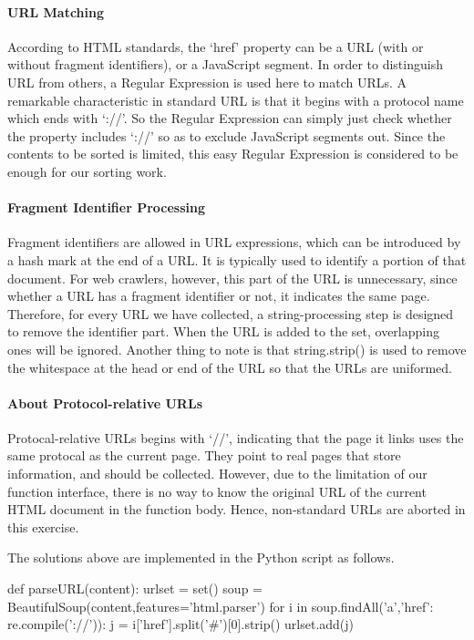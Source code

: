 \documentclass{article}
\begin{document}
\paragraph{URL Matching} According to HTML standards, the `href' property can be a URL (with or without fragment identifiers), or a JavaScript segment. In order to distinguish URL from others, a Regular Expression is used here to match URLs. A remarkable characteristic in standard URL is that it begins with a protocol name which ends with `://'. So the Regular Expression can simply just check whether the property includes `://'   so as to exclude JavaScript segments out. Since the contents to be sorted is limited, this easy Regular Expression is considered to be enough for our sorting work.

\paragraph{Fragment Identifier Processing} Fragment identifiers are allowed in URL expressions, which can be introduced by a hash mark at the end of a URL. It is typically used to identify a portion of that document. For web crawlers, however, this part of the URL is unnecessary, since whether a URL has a fragment identifier or not, it indicates the same page. Therefore, for every URL we have collected, a string-processing step is designed to remove the identifier part. When the URL is added to the set, overlapping ones will be ignored. Another thing to note is that string.strip() is used to remove the whitespace at the head or end of the URL so that the URLs are uniformed.

\paragraph{About Protocol-relative URLs} Protocal-relative URLs begins with `//', indicating that the page it links uses the same protocal as the current page. They point to real pages that store information, and should be collected. However, due to the limitation of our function interface, there is no way to know the original URL of the current HTML document in the function body. Hence, non-standard URLs are aborted in this exercise.

The solutions above are implemented in the Python script as follows.
\begin{python}
def parseURL(content):
    urlset = set()
    soup = BeautifulSoup(content,features='html.parser')
    for i in soup.findAll('a',{'href': re.compile('://')}):
        j = i['href'].split('#')[0].strip()
        urlset.add(j)
\end{python}
\end{document}
